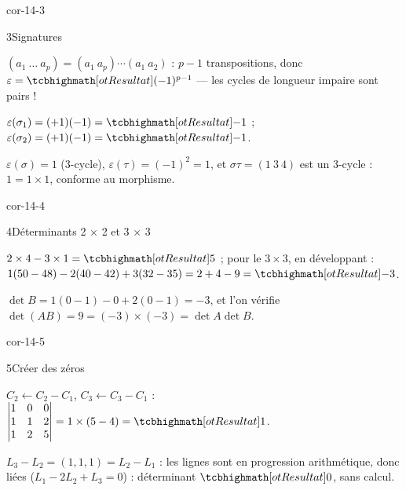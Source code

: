 \begin{blocLivre}{cor-14-3}
\begin{corrige}{3}{Signatures}
\begin{questions}
  \item $(a_1\ \dots\ a_p)=(a_1\ a_p)\cdots(a_1\ a_2)$ : $p-1$
    transpositions, donc $\varepsilon=\res{(-1)^{p-1}}$ — les cycles de
    longueur impaire sont pairs !
  \item $\varepsilon(\sigma_1)=(+1)(-1)=\res{-1}$ ;
    $\varepsilon(\sigma_2)=(+1)(-1)=\res{-1}$.
  \item $\varepsilon(\sigma)=1$ ($3$-cycle), $\varepsilon(\tau)=(-1)^{2}=1$,
    et $\sigma\tau=(1\ 3\ 4)$ est un $3$-cycle : $1=1\times1$, conforme au
    morphisme.
\end{questions}
\end{corrige}
\end{blocLivre}

\begin{blocLivre}{cor-14-4}
\begin{corrige}{4}{Déterminants 2 × 2 et 3 × 3}
\begin{questions}
  \item $2\times4-3\times1=\res{5}$ ; pour le $3\times3$, en développant :
    $1(50-48)-2(40-42)+3(32-35)=2+4-9=\res{-3}$.
  \item $\det B=1(0-1)-0+2(0-1)=-3$, et l'on vérifie
    $\det(AB)=9=(-3)\times(-3)=\det A\det B$.
\end{questions}
\end{corrige}
\end{blocLivre}

\begin{blocLivre}{cor-14-5}
\begin{corrige}{5}{Créer des zéros}
\begin{questions}
  \item $C_2\leftarrow C_2-C_1$, $C_3\leftarrow C_3-C_1$ :
    $\begin{vmatrix}1&0&0\\1&1&2\\1&2&5\end{vmatrix}
    =1\times(5-4)=\res{1}$.
  \item $L_3-L_2=(1,1,1)=L_2-L_1$ : les lignes sont en progression
    arithmétique, donc liées ($L_1-2L_2+L_3=0$) : déterminant
    $\res{0}$, sans calcul.
\end{questions}
\end{corrige}
\end{blocLivre}


